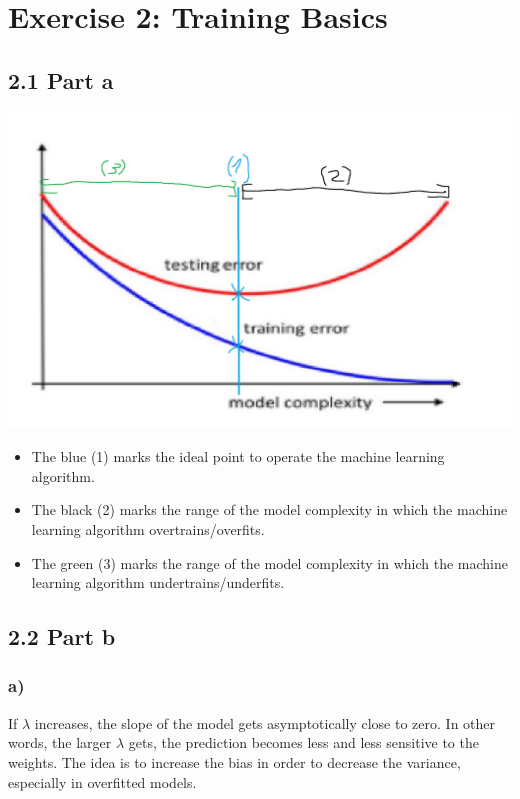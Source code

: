 \documentclass[a4paper]{article}
\begin{document}
    

\newpage
\section*{Exercise 2: Training Basics}
    \subsection*{2.1 Part a}
        \includegraphics[width=0.6\linewidth]{2.1.png}
        \begin{itemize}
            \item The blue (1) marks the ideal point to operate the machine learning algorithm.
            \item The black (2) marks the range of the model complexity in which the machine learning algorithm overtrains/overfits.
            \item The green (3) marks the range of the model complexity in which the machine learning algorithm undertrains/underfits.
        \end{itemize}
        
        
    \subsection*{2.2 Part b}
        \subsubsection*{a)}
            If $\lambda$ increases, the slope of the model gets asymptotically close to zero.
            In other words, the larger $\lambda$ gets, the prediction becomes less and less sensitive to the weights.
            The idea is to increase the bias in order to decrease the variance, especially in overfitted models.
            
\end{document}
